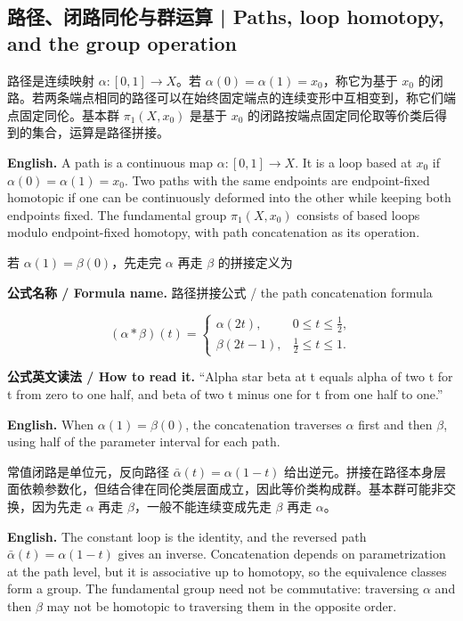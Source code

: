 \documentclass[UTF8,11pt,a4paper]{ctexart}
\newcommand{\EN}[1]{\par\noindent\textbf{English.} #1\par}
\newcommand{\READ}[1]{\par\noindent\textbf{公式英文读法 / How to read it.} #1\par}
\newcommand{\FORMULA}[2]{\par\noindent\textbf{公式名称 / Formula name.} #1 / #2\par}
\begin{document}
\subsection{路径、闭路同伦与群运算 | Paths, loop homotopy, and the group operation}
\noindent 路径是连续映射 $\alpha:[0,1]\to X$。若 $\alpha(0)=\alpha(1)=x_0$，称它为基于 $x_0$ 的闭路。若两条端点相同的路径可以在始终固定端点的连续变形中互相变到，称它们端点固定同伦。基本群 $\pi_1(X,x_0)$ 是基于 $x_0$ 的闭路按端点固定同伦取等价类后得到的集合，运算是路径拼接。
\EN{A path is a continuous map $\alpha:[0,1]\to X$. It is a loop based at $x_0$ if $\alpha(0)=\alpha(1)=x_0$. Two paths with the same endpoints are endpoint-fixed homotopic if one can be continuously deformed into the other while keeping both endpoints fixed. The fundamental group $\pi_1(X,x_0)$ consists of based loops modulo endpoint-fixed homotopy, with path concatenation as its operation.}
\noindent 若 $\alpha(1)=\beta(0)$，先走完 $\alpha$ 再走 $\beta$ 的拼接定义为
\FORMULA{路径拼接公式}{the path concatenation formula}
\[
(\alpha*\beta)(t)=
\begin{cases}
\alpha(2t),&0\le t\le\tfrac12,\\
\beta(2t-1),&\tfrac12\le t\le1.
\end{cases}
\]
\READ{“Alpha star beta at t equals alpha of two t for t from zero to one half, and beta of two t minus one for t from one half to one.”}
\EN{When $\alpha(1)=\beta(0)$, the concatenation traverses $\alpha$ first and then $\beta$, using half of the parameter interval for each path.}
\noindent 常值闭路是单位元，反向路径 $\bar\alpha(t)=\alpha(1-t)$ 给出逆元。拼接在路径本身层面依赖参数化，但结合律在同伦类层面成立，因此等价类构成群。基本群可能非交换，因为先走 $\alpha$ 再走 $\beta$，一般不能连续变成先走 $\beta$ 再走 $\alpha$。
\EN{The constant loop is the identity, and the reversed path $\bar\alpha(t)=\alpha(1-t)$ gives an inverse. Concatenation depends on parametrization at the path level, but it is associative up to homotopy, so the equivalence classes form a group. The fundamental group need not be commutative: traversing $\alpha$ and then $\beta$ may not be homotopic to traversing them in the opposite order.}
\end{document}
